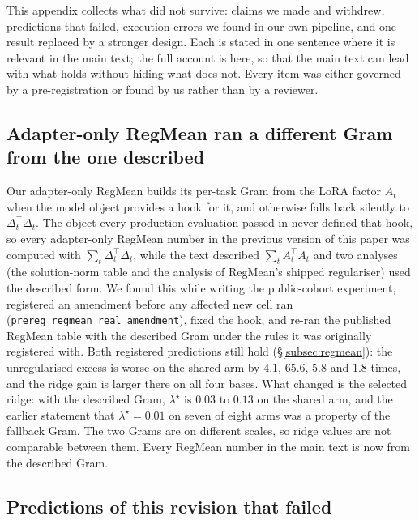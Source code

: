 
This appendix collects what did not survive: claims we made and withdrew,
predictions that failed, execution errors we found in our own pipeline, and
one result replaced by a stronger design.
Each is stated in one sentence where it is relevant in the main text; the full
account is here, so that the main text can lead with what holds without
hiding what does not. Every item was either governed by a pre-registration or
found by us rather than by a reviewer.

\subsection{Adapter-only RegMean ran a different Gram from the one described}
\label{subsec:gram-error}

Our adapter-only RegMean builds its per-task Gram from the LoRA factor $A_t$
when the model object provides a hook for it, and otherwise falls back
silently to $\Delta_t^\top\Delta_t$. The object every production evaluation
passed in never defined that hook, so every adapter-only RegMean number in the
previous version of this paper was computed with $\sum_t \Delta_t^\top\Delta_t$,
while the text described $\sum_t A_t^\top A_t$ and two analyses (the
solution-norm table and the analysis of RegMean's shipped regulariser) used the
described form. We found this while writing the public-cohort experiment,
registered an amendment before any affected new cell ran
(\texttt{prereg\_regmean\_real\_amendment}), fixed the hook, and re-ran the
published RegMean table with the described Gram under the rules it was
originally registered with. Both registered predictions still hold
(\S\ref{subsec:regmean}): the unregularised excess is worse on the shared arm
by $4.1$, $65.6$, $5.8$ and $1.8$ times, and the ridge gain is larger there on
all four bases. What changed is the selected ridge: with the described Gram,
$\lambda^\star$ is $0.03$ to $0.13$ on the shared arm, and the earlier statement
that $\lambda^\star = 0.01$ on seven of eight arms was a property of the
fallback Gram. The two Grams are on different scales, so ridge values are not
comparable between them. Every RegMean number in the main text is now from the
described Gram.

\subsection{Predictions of this revision that failed}
\label{subsec:failed-2026-09}


